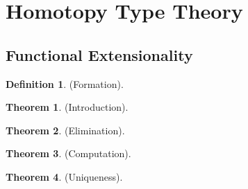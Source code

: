 \documentclass{article}
\theoremstyle{definition}
\newtheorem{definition}{Definition}
\newtheorem{theorem}{Theorem}
\begin{document}
\section{Homotopy Type Theory}
\subsection{Functional Extensionality}

\begin{definition} (Formation).
\end{definition}

\begin{theorem} (Introduction).
\end{theorem}

\begin{theorem} (Elimination).
\end{theorem}

\begin{theorem} (Computation).
\end{theorem}

\begin{theorem} (Uniqueness).
\end{theorem}






\end{document}
